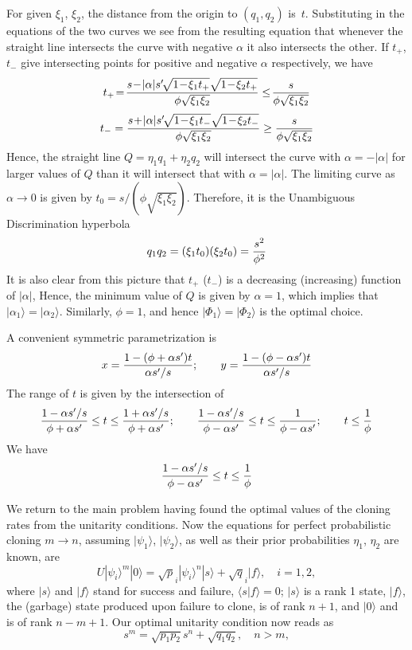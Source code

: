 \documentclass[aps,prl,twocolumn,eqsecnum,showpacs]{revtex4}
\newcommand{\ke}[1]{|#1\rangle}
\begin{document}
For given $\xi_1$, $\xi_2$, the distance from the origin to $(q_1,q_2)$ is~$t$. Substituting in the equations of the two curves we see from the resulting equation that whenever the straight line intersects the curve with negative $\alpha$ it also intersects the other. If $t_+$, $t_-$ give intersecting points for positive and negative $\alpha$ respectively, we have
$$
t_+\!=\!{s\!-\!|\alpha|s'\!\sqrt{1\!-\!\xi_1 t_+}\sqrt{1\!-\!\xi_2 t_+}\over\phi\sqrt{\xi_1\xi_2}}\le\!{s\over\phi\sqrt{\xi_1\xi_2}}$$
$$
t_- ={s\!+\!|\alpha|s'\!\sqrt{1\!-\!\xi_1 t_-}\sqrt{1\!-\!\xi_2 t_-}\over\phi\sqrt{\xi_1\xi_2}}\ge{s\over\phi\sqrt{\xi_1\xi_2}}
$$
Hence, the straight line $Q=\eta_1 q_1+\eta_2 q_2$ will intersect the curve with $\alpha=-|\alpha|$ for larger values of $Q$ than it will intersect that with $\alpha=|\alpha|$.
The limiting curve as $\alpha\to0$ is given by $t_0=s/(\phi\sqrt{\xi_1\xi_2})$. Therefore, it is the Unambiguous Discrimination hyperbola 
$$
q_1 q_2=(\xi_1t_0)(\xi_2 t_0)={s^2\over\phi^2}
$$
It is also clear from this picture that $t_+$ ($t_-$) is a decreasing (increasing) function of $|\alpha|$, Hence, the minimum value of $Q$ is given by $\alpha=1$, which implies that~$|\alpha_1\rangle=|\alpha_2\rangle$. Similarly, $\phi=1$, and hence $|\Phi_1\rangle=|\Phi_2\rangle$ is the optimal choice.

A convenient symmetric parametrization is
$$
x={1-(\phi+\alpha s')t\over \alpha s'/s};\qquad y={1-(\phi-\alpha s')t\over \alpha s'/s}
$$
The range of $t$ is given by the intersection of
$$
{1-\alpha s'/s\over\phi+\alpha s'}\le t\le{1+\alpha s'/s\over\phi+\alpha s'};\qquad
{1-\alpha s'/s\over\phi-\alpha s'}\le t\le{1\over\phi-\alpha s'};\qquad 
t\le{1\over\phi}
$$
We have
$$
{1-\alpha s'/s\over\phi-\alpha s'}\le t\le {1\over\phi}
$$

We return to the main problem having found the optimal values of the cloning rates from the unitarity conditions.  Now the equations for perfect probabilistic cloning $m\to n$, assuming $|\psi_1\rangle$, $|\psi_2\rangle$, as well as their prior probabilities $\eta_1$, $\eta_2$ are known, are 
\begin{equation}
U|\psi_i\rangle^m|0\rangle=\sqrt p_i |\psi_i\rangle^n|s\rangle+\sqrt q_i |f\rangle,\quad i=1,2,
\end{equation}
where $|s\rangle$ and $|f\rangle$ stand for success and failure, $\langle s| f\rangle=0$;  $|s\rangle$ is a rank 1 state, $\ke f$, the (garbage) state produced upon failure to clone, is of rank $n+1$, and $\ke 0$ and is of rank $n-m+1$.
Our optimal unitarity condition now reads as
$$
s^m=\sqrt{p_1p_2}s^n+\sqrt{q_1 q_2}, \quad n>m,
$$
\end{document}
